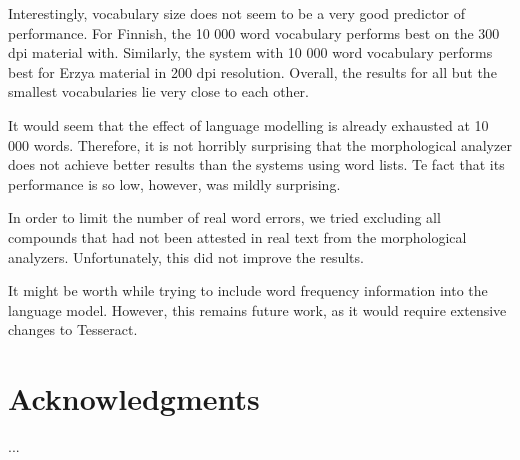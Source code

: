 \documentclass[b5paper]{article}
\begin{document}
Interestingly, vocabulary size does not seem to be a very good
predictor of performance. For Finnish, the 10 000 word vocabulary
performs best on the 300 dpi material with. Similarly, the system with
10 000 word vocabulary performs best for Erzya material in 200 dpi
resolution. Overall, the results for all but the smallest vocabularies
lie very close to each other.

It would seem that the effect of language modelling is already
exhausted at 10 000 words. Therefore, it is not horribly surprising
that the morphological analyzer does not achieve better results than
the systems using word lists. Te fact that its performance
is so low, however, was mildly surprising.

In order to limit the number of real word errors, we tried excluding
all compounds that had not been attested in real text from the
morphological analyzers. Unfortunately, this did not improve the
results.

It might be worth while trying to include word frequency information into
the language model. However, this remains future work, as it would
require extensive changes to Tesseract.

\section*{Acknowledgments}

...



\end{document}
